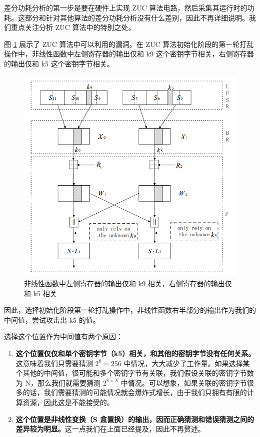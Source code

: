 差分功耗分析的第一步是要在硬件上实现 ZUC 算法电路，然后采集其运行时的功耗。这部分和针对其他算法的差分功耗分析没有什么差别，因此不再详细说明。我们重点关注分析 ZUC 算法中的特别之处。

\vspace*{\baselineskip}

图 \ref{fig:zuc_attack} 展示了 ZUC 算法中可以利用的漏洞。在 ZUC 算法初始化阶段的第一轮打乱操作中，非线性函数中左侧寄存器的输出仅和 k9 这个密钥字节相关，右侧寄存器的输出仅和 k5 这个密钥字节相关。 \cite{zuc_attack_tangming}

\begin{figure}[htbp]
    \centering
    \includegraphics[height=.5\textheight]{../images/zuc_attack.png}
    \caption{非线性函数中左侧寄存器的输出仅和 k9 相关，右侧寄存器的输出仅和 k5 相关\cite{zuc_attack_tangming}}
    \label{fig:zuc_attack}

\end{figure}

因此，选择初始化阶段第一轮打乱操作中，非线性函数右半部分的输出作为我们的中间值，尝试攻击出 k5 的值。

\vspace*{\baselineskip}

选择这个位置作为中间值有两个原因：

\begin{enumerate}
    \item \textbf{这个位置仅仅和单个密钥字节（k5）相关，和其他的密钥字节没有任何关系。}这意味着我们只需要猜测 $2^8=256$ 中情况，大大减少了工作量。如果选择某个其他的中间值，很可能和多个密钥字节有关联，我们假设关联的密钥字节数为 N，那么我们就需要猜测 $2^{8 \times N}$ 中情况。可以想象，如果关联的密钥字节很多的话，我们需要猜测的可能情况就会爆炸式增长，由于我们只拥有有限的计算资源，因此这是不能接受的。
    \item \textbf{这个位置是非线性变换（S 盒置换）的输出，因而正确猜测和错误猜测之间的差异较为明显。}这一点我们在上面已经提及，因此不再赘述。
\end{enumerate}

